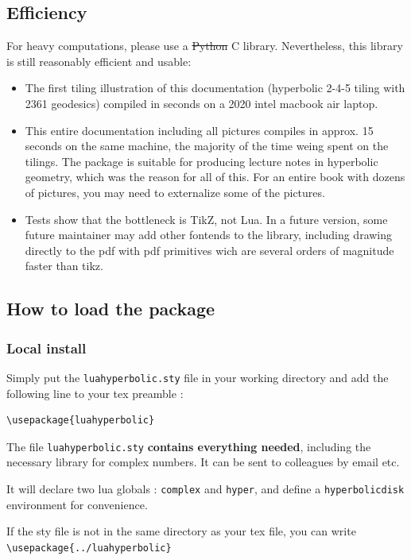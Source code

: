 \documentclass{article}
\begin{document}
\subsection{Efficiency}

For heavy computations, please use a \sout{Python} C library. Nevertheless, this library is still reasonably efficient and usable:
\begin{itemize}
\item The first tiling illustration of this documentation (hyperbolic 2-4-5 tiling with 2361 geodesics) compiled in  seconds on a 2020 intel macbook air laptop.
\item This entire documentation including all pictures compiles in approx. 15 seconds on the same machine, the majority of the time weing spent on the tilings. The package is suitable for producing lecture notes in hyperbolic geometry, which was the reason for all of this. For an entire book with dozens of pictures, you may need to externalize some of the pictures.
\item Tests show that the bottleneck is TikZ, not Lua. In a future version, some future maintainer may add other fontends to the library, including drawing directly to the pdf with pdf primitives wich are several orders of magnitude faster than tikz.
\end{itemize}


\subsection{How to load the package}

\subsubsection*{Local install}
Simply put the \verb+luahyperbolic.sty+ file in your working directory and  add the following line to your tex preamble :
\begin{verbatim}
\usepackage{luahyperbolic}
\end{verbatim}

The file \texttt{luahyperbolic.sty} \textbf{contains everything needed}, including the necessary library for complex numbers.  It can be sent to colleagues by email etc.

It will declare two lua globals : \texttt{complex} and \texttt{hyper}, and define a \texttt{hyperbolicdisk} environment for convenience.

If the sty file is not in the same directory as your tex file, you can write \verb+\usepackage{../luahyperbolic}+
\end{document}
